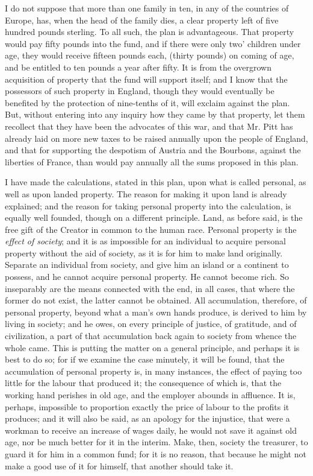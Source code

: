 I do not suppose that more than one family in ten, in any of the countries of Europe, has, when the head of the family dies, a clear property left of five hundred pounds sterling. To all such, the plan is advantageous. That property would pay fifty pounds into the fund, and if there were only two’ children under age, they would receive fifteen pounds each, (thirty pounds) on coming of age, and be entitled to ten pounds a year after fifty. It is from the overgrown acquisition of property that the fund will support itself; and I know that the possessors of such property in England, though they would eventually be benefited by the protection of nine-tenths of it, will exclaim against the plan. But, without entering into any inquiry how they came by that property, let them recollect that they have been the advocates of this war, and that Mr. Pitt has already laid on more new taxes to be raised annually upon the people of England, and that for supporting the despotism of Austria and the Bourbons, against the liberties of France, than would pay annually all the sums proposed in this plan.

I have made the calculations, stated in this plan, upon what is called personal, as well as upon landed property. The reason for making it upon land is already explained; and the reason for taking personal property into the calculation, is equally well founded, though on a different principle. Land, as before said, is the free gift of the Creator in common to the human race. Personal property is the \emph{effect of society}; and it is as impossible for an individual to acquire personal property without the aid of society, as it is for him to make land originally. Separate an individual from society, and give him an island or a continent to possess, and he cannot acquire personal property. He cannot become rich. So inseparably are the means connected with the end, in all cases, that where the former do not exist, the latter cannot be obtained. All accumulation, therefore, of personal property, beyond what a man’s own hands produce, is derived to him by living in society; and he owes, on every principle of justice, of gratitude, and of civilization, a part of that accumulation back again to society from whence the whole came. This is putting the matter on a general principle, and perhaps it is best to do so; for if we examine the case minutely, it will be found, that the accumulation of personal property is, in many instances, the effect of paying too little for the labour that produced it; the consequence of which is, that the working hand perishes in old age, and the employer abounds in affluence. It is, perhaps, impossible to proportion exactly the price of labour to the profits it produces; and it will also be said, as an apology for the injustice, that were a workman to receive an increase of wages daily, he would not save it against old age, nor be much better for it in the interim. Make, then, society the treasurer, to guard it for him in a common fund; for it is no reason, that because he might not make a good use of it for himself, that another should take it.

